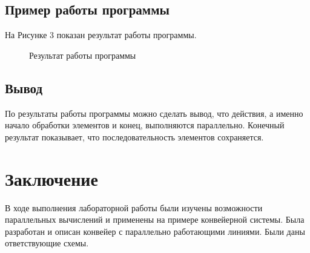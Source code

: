 \documentclass[14pt, a4paper]{extarticle}
\begin{document}
	\subsection{Пример работы программы}
	На Рисунке 3 показан результат работы программы. 
	\begin{figure}[h!]
		\caption{Результат работы программы}
	\end{figure}

	\subsection*{Вывод}
	По результаты работы программы можно сделать вывод, что действия, а именно начало обработки элементов и конец, выполняются параллельно. Конечный результат показывает, что последовательность элементов сохраняется.
	\clearpage
	
	\clearpage
	\section*{Заключение}
	В ходе выполнения лабораторной работы были изучены возможности параллельных вычислений и применены на примере конвейерной системы. Была разработан и описан конвейер с параллельно работающими линиями. Были даны ответствующие схемы. 
	
\end{document}
